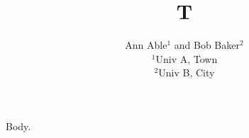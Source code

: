 \documentclass{article}
\author{Ann Able$^{1}$ and Bob Baker$^{2}$\\ {\small $^{1}$Univ A, Town}\\ {\small $^{2}$Univ B, City}}
\title{T}
\begin{document}
\maketitle
Body.
\end{document}
